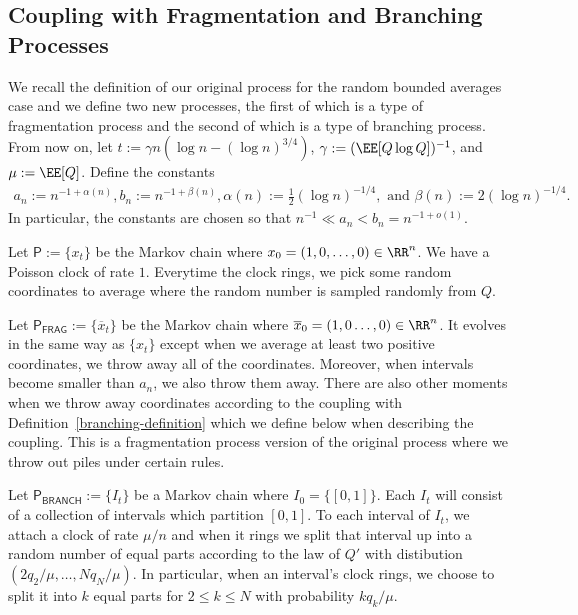 \documentclass[12pt]{article}
\begin{document}
\subsection{Coupling with Fragmentation and Branching Processes}

We recall the definition of our original process for the random bounded averages case and we define two new processes, the first of which is a type of fragmentation process and the second of which is a type of branching process. From now on, let $t := \gamma n ( \log n - (\log n)^{3/4})$, $\gamma := (\EE[Q \log Q])^{-1}$, and $\mu := \EE[Q]$. Define the constants
\begin{align*}
	a_n := n^{-1 + \alpha(n)}, b_n := n^{-1 + \beta(n)},  \alpha(n) := \frac{1}{2} (\log n)^{-1/4}, \text{ and } \beta(n) := 2 (\log n)^{-1/4}.
\end{align*}
In particular, the constants are chosen so that $n^{-1} \ll a_n < b_n = n^{-1 + o(1)}$. 

\begin{defn} 
	Let $\mathsf{P} := \{x_t\}$ be the Markov chain where $x_0 = (1, 0, \ldots, 0) \in \RR^n$. We have a Poisson clock of rate $1$. Everytime the clock rings, we pick some random coordinates to average where the random number is sampled randomly from $Q$. 
\end{defn}

\begin{defn}  \label{fragmentation-definition}
	Let $\mathsf{P}_{\mathsf{FRAG}} := \{\overline{x}_t\}$ be the Markov chain where $\overline{x}_0 = (1, 0 \ldots, 0) \in \RR^n$. It evolves in the same way as $\{x_t\}$ except when we average at least two positive coordinates, we throw away all of the coordinates. Moreover, when intervals become smaller than $a_n$, we also throw them away. There are also other moments when we throw away coordinates according to the coupling with Definition~\ref{branching-definition} which we define below when describing the coupling. This is a fragmentation process version of the original process where we throw out piles under certain rules. 
\end{defn}

\begin{defn}  \label{branching-definition}
	Let $\mathsf{P}_{\mathsf{BRANCH}} := \{I_t\}$ be a Markov chain where $I_0 = \{[0, 1]\}$. Each $I_t$ will consist of a collection of intervals which partition $[0, 1]$. To each interval of $I_t$, we attach a clock of rate $\mu / n$ and when it rings we split that interval up into a random number of equal parts according to the law of $Q'$ with distibution $(2q_2 / \mu, \ldots, Nq_N /\mu)$. In particular, when an interval's clock rings, we choose to split it into $k$ equal parts for $2 \leq k \leq N$ with probability $k q_k /\mu$.  
\end{defn}
\end{document}
